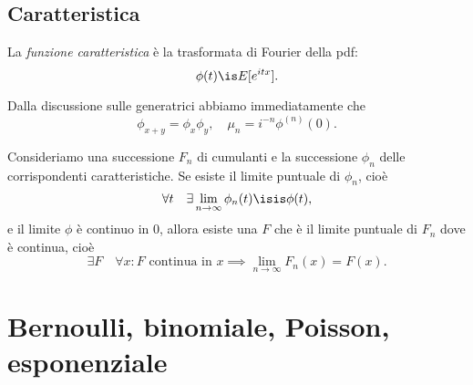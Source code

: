 \subsection{Caratteristica}

\begin{definition}
	La \emph{funzione caratteristica} è la trasformata di Fourier della pdf:
	\begin{equation*}
		\phi(t) \is E[e^{itx}].
	\end{equation*}
\end{definition}
Dalla discussione sulle generatrici abbiamo immediatamente che
\begin{equation*}
	\phi_{x+y} = \phi_x\phi_y, \quad \mu_n = i^{-n} \phi^{(n)}(0).
\end{equation*}

\begin{fact}
	\label{th:paullevy}
	Consideriamo una successione $F_n$ di cumulanti e la successione $\phi_n$ delle corrispondenti caratteristiche.
	Se esiste il limite puntuale di $\phi_n$, cioè
	\begin{equation*}
		\forall t \quad \exists \lim_{n\to\infty} \phi_n(t) \isis \phi(t),
	\end{equation*}
	e il limite $\phi$ è continuo in 0, allora
	esiste una $F$ che è il limite puntuale di $F_n$ dove è continua, cioè
	\begin{equation*}
		\exists F \quad \forall x: \text{$F$ continua in $x$} \implies
		\lim_{n\to\infty} F_n(x) = F(x).
	\end{equation*}
\end{fact}

\section{Bernoulli, binomiale, Poisson, esponenziale}

